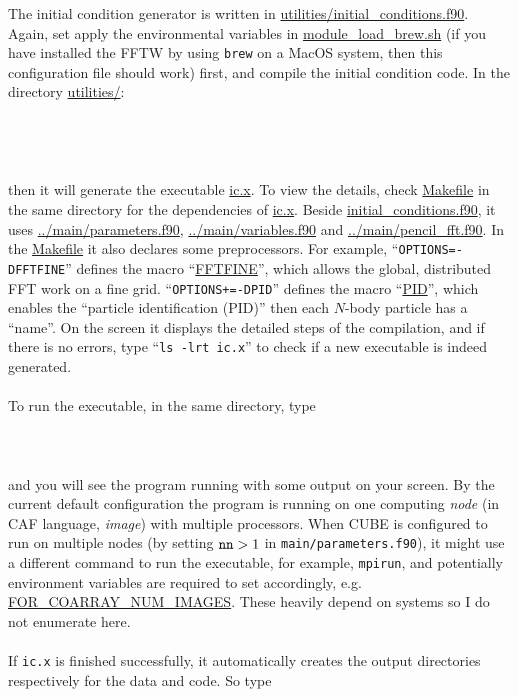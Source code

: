 \documentclass[12pt]{article}
\begin{document}
The initial condition generator is written in \url{utilities/initial_conditions.f90}. Again, set apply the environmental variables in \url{module_load_brew.sh} (if you have installed the FFTW by using {\tt brew} on a MacOS system, then this configuration file should work) first, and compile the initial condition code. In the directory \url{utilities/}:
\\\\
\\
\\\\
then it will generate the executable \url{ic.x}. To view the details, check \url{Makefile} in the same directory for the dependencies of \url{ic.x}. Beside \url{initial_conditions.f90}, it uses \url{../main/parameters.f90}, \url{../main/variables.f90} and \url{../main/pencil_fft.f90}. In the \url{Makefile} it also declares some preprocessors. For example, ``{\tt OPTIONS=-DFFTFINE}'' defines the macro ``\url{FFTFINE}'', which allows the global, distributed FFT work on a fine grid. ``{\tt OPTIONS+=-DPID}'' defines the macro ``\url{PID}'', which enables the ``particle identification (PID)'' then each $N$-body particle has a ``name''. On the screen it displays the detailed steps of the compilation, and if there is no errors, type ``{\tt ls -lrt ic.x}'' to check if a new executable is indeed generated.
\\\\
To run the executable, in the same directory, type
\\\\
\\\\
and you will see the program running with some output on your screen. By the current default configuration the program is running on one computing {\it node} (in CAF language, {\it image}) with multiple processors. When CUBE is configured to run on multiple nodes (by setting ${\tt nn}>1$ in {\tt main/parameters.f90}), it might use a different command to run the executable, for example, {\tt mpirun}, and potentially environment variables are required to set accordingly, e.g. \url{FOR_COARRAY_NUM_IMAGES}. These heavily depend on systems so I do not enumerate here.
\\\\
If {\tt ic.x} is finished successfully, it automatically creates the output directories respectively for the data and code. So type
\\\\
\end{document}
